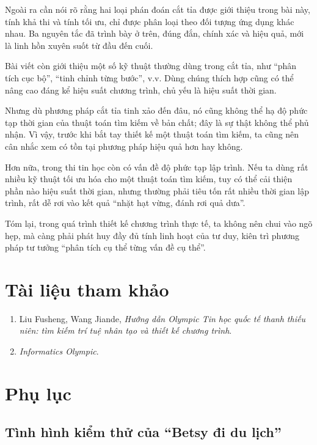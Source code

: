 \documentclass[11pt]{article}
\begin{document}
Ngoài ra cần nói rõ rằng hai loại phán đoán cắt tỉa được giới thiệu trong bài
này, tính khả thi và tính tối ưu, chỉ được phân loại theo đối tượng ứng dụng
khác nhau. Ba nguyên tắc đã trình bày ở trên, đúng đắn, chính xác và hiệu
quả, mới là linh hồn xuyên suốt từ đầu đến cuối.

Bài viết còn giới thiệu một số kỹ thuật thường dùng trong cắt tỉa, như
``phân tích cục bộ'', ``tinh chỉnh từng bước'', v.v. Dùng chúng thích hợp cũng
có thể nâng cao đáng kể hiệu suất chương trình, chủ yếu là hiệu suất thời
gian.

Nhưng dù phương pháp cắt tỉa tinh xảo đến đâu, nó cũng không thể hạ độ phức
tạp thời gian của thuật toán tìm kiếm về bản chất; đây là sự thật không thể
phủ nhận. Vì vậy, trước khi bắt tay thiết kế một thuật toán tìm kiếm, ta cũng
nên cân nhắc xem có tồn tại phương pháp hiệu quả hơn hay không.

Hơn nữa, trong thi tin học còn có vấn đề độ phức tạp lập trình. Nếu ta dùng
rất nhiều kỹ thuật tối ưu hóa cho một thuật toán tìm kiếm, tuy có thể cải
thiện phần nào hiệu suất thời gian, nhưng thường phải tiêu tốn rất nhiều thời
gian lập trình, rất dễ rơi vào kết quả ``nhặt hạt vừng, đánh rơi quả dưa''.

Tóm lại, trong quá trình thiết kế chương trình thực tế, ta không nên chui vào
ngõ hẹp, mà càng phải phát huy đầy đủ tính linh hoạt của tư duy, kiên trì
phương pháp tư tưởng ``phân tích cụ thể từng vấn đề cụ thể''.

\section*{Tài liệu tham khảo}

\begin{enumerate}
  \item Liu Fusheng, Wang Jiande, \textit{Hướng dẫn Olympic Tin học quốc tế
  thanh thiếu niên: tìm kiếm trí tuệ nhân tạo và thiết kế chương trình}.
  \item \textit{Informatics Olympic}.
\end{enumerate}

\appendix
\section{Phụ lục}

\subsection{Tình hình kiểm thử của ``Betsy đi du lịch''}
\end{document}
